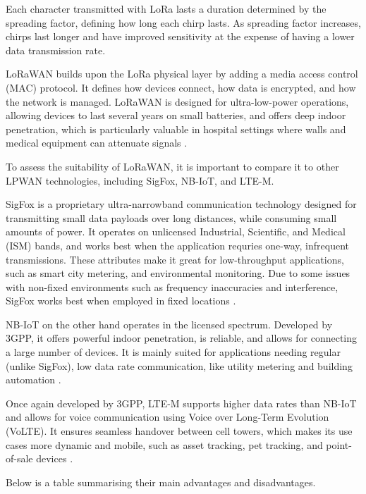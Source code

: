 Each character transmitted with LoRa lasts a duration determined by the spreading factor, defining how long each chirp lasts. As spreading factor increases, chirps last longer and have improved sensitivity at the expense of having a lower data transmission rate.

LoRaWAN builds upon the LoRa physical layer by adding a media access control (MAC) protocol. It defines how devices connect, how data is encrypted, and how the network is managed. LoRaWAN is designed for ultra-low-power operations, allowing devices to last several years on small batteries, and offers deep indoor penetration, which is particularly valuable in hospital settings where walls and medical equipment can attenuate signals \cite{lora_documentation}.

To assess the suitability of LoRaWAN, it is important to compare it to other LPWAN technologies, including SigFox, NB-IoT, and LTE-M.

SigFox is a proprietary ultra-narrowband communication technology designed for transmitting small data payloads over long distances, while consuming small amounts of power. It operates on unlicensed Industrial, Scientific, and Medical (ISM) bands, and works best when the application requries one-way, infrequent transmissions. These attributes make it great for low-throughput applications, such as smart city metering, and environmental monitoring. Due to some issues with non-fixed environments such as frequency inaccuracies and interference, SigFox works best when employed in fixed locations \cite{sigfox_advantages_disadvantages}.

NB-IoT on the other hand operates in the licensed spectrum. Developed by 3GPP, it offers powerful indoor penetration, is reliable, and allows for connecting a large number of devices. It is mainly suited for applications needing regular (unlike SigFox), low data rate communication, like utility metering and building automation \cite{nbiot_advantages_disadvantages}.

Once again developed by 3GPP, LTE-M supports higher data rates than NB-IoT and allows for voice communication using Voice over Long-Term Evolution (VoLTE). It ensures seamless handover between cell towers, which makes its use cases more dynamic and mobile, such as asset tracking, pet tracking, and point-of-sale devices \cite{ltem_telenor}.

Below is a table summarising their main advantages and disadvantages.



